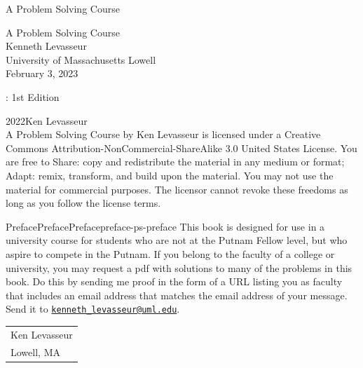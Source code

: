 \documentclass[oneside,10pt,]{book}
\newcommand{\titlepagefont}{\relax}
\numberwithin{equation}{section}
\begin{document}
\raggedbottom
\frontmatter
\thispagestyle{empty}
{\titlepagefont\centering
\vspace*{0.28\textheight}
{\Huge A Problem Solving Course}\\}
\clearpage
\thispagestyle{empty}
{\titlepagefont\centering
\vspace*{0.14\textheight}
{\Huge A Problem Solving Course}\\[3\baselineskip]
{\Large Kenneth Levasseur}\\[0.5\baselineskip]
{\Large University of Massachusetts Lowell}\\[3\baselineskip]
{\Large February 3, 2023}\\}
\clearpage
\thispagestyle{empty}
\hypertarget{colophon-ps-index-b}{}
: 1st Edition\par\medskip
\noindent\textcopyright{}2022\quad{}Ken Levasseur\\[0.5\baselineskip]
A Problem Solving Course by  Ken Levasseur is licensed under a Creative Commons Attribution-NonCommercial-ShareAlike 3.0 United States License. You are free to Share: copy and redistribute the material in any medium or format; Adapt: remix, transform, and build upon the material. You may not use the material for commercial purposes.  The licensor cannot revoke these freedoms as long as you follow the license terms.\par\medskip
{}
\null\clearpage
%
%
\typeout{************************************************}
\typeout{************************************************}
%
\begin{preface}{Preface}{Preface}{}{Preface}{}{}{preface-ps-preface}
This book is designed for use in a university course for students who are not at the Putnam Fellow level, but who aspire to compete in the Putnam.  If you belong to the faculty of a college or university, you may request a pdf with solutions to many of the problems in this book. Do this by sending me proof in the form of a URL listing you as faculty that includes an email address that matches the email address of your message.  Send it to \href{mailto:kenneth_levasseur@uml.edu}{\nolinkurl{kenneth_levasseur@uml.edu}}.%
\nopagebreak\par%
\hfill\begin{tabular}[t]{l@{}}
Ken Levasseur\\
Lowell, MA
\end{tabular}\\\par
\end{preface}
\end{document}
